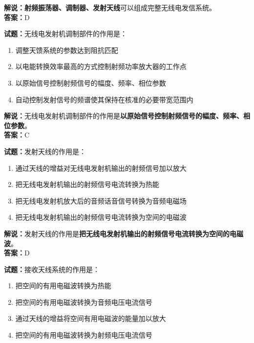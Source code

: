 \documentclass{ctexbook}
\begin{document}
\noindent\textbf{解说：}\textbf{射频振荡器、调制器、发射天线}可以组成完整无线电发信系统。\\\noindent\textbf{答案：}D%


\bigskip


\noindent\textbf{试题：}无线电发射机调制部件的作用是：

\begin{enumerate}[leftmargin=3em]
	\item 调整天馈系统的参数达到阻抗匹配
	\item 以电能转换效率最高的方式控制射频功率放大器的工作点
	\item 以原始信号控制射频信号的幅度、频率、相位参数
	\item 自动控制发射信号的频谱使其保持在核准的必要带宽范围内
\end{enumerate}

\noindent\textbf{解说：}无线电发射机调制部件的作用是\textbf{以原始信号控制射频信号的幅度、频率、相位参数}。\\\noindent\textbf{答案：}C%


\bigskip


\noindent\textbf{试题：}发射天线的作用是：

\begin{enumerate}[leftmargin=3em]
	\item 通过天线的增益对无线电发射机输出的射频信号加以放大
	\item 把无线电发射机输出的射频信号电流转换为热能
	\item 把无线电发射机放大后的音频话音信号转换为音频电磁场
	\item 把无线电发射机输出的射频信号电流转换为空间的电磁波
\end{enumerate}

\noindent\textbf{解说：}发射天线的作用是\textbf{把无线电发射机输出的射频信号电流转换为空间的电磁波}。\\\noindent\textbf{答案：}D%


\bigskip


\noindent\textbf{试题：}接收天线系统的作用是：

\begin{enumerate}[leftmargin=3em]
	\item 把空间的有用电磁波转换为热能
	\item 把空间的有用电磁波转换为音频电压电流信号
	\item 通过天线的增益将空间有用电磁波的能量加以放大
	\item 把空间的有用电磁波转换为射频电压电流信号
\end{enumerate}
\end{document}
